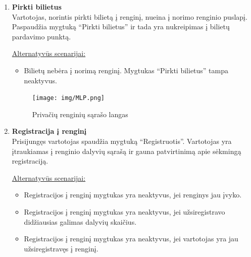 \documentclass{VUMIFPSkursinis}
\begin{document}
\begin{enumerate} [label = \textbf{U\arabic*.}]
				\underline{Alternatyvūs scenarijai:}
				\begin{itemize}
						\item Vartotojui įvedus neteisingą prisijungimo informaciją ar neužpildžius, kurio nors prisijungimo laukelio, sistema paprašo dar kartą įvesti duomenis.
				\end{itemize}

				\begin{figure}[H]
					\centering
					\texttt{[image: img/MLP.png]}
					\caption{Renginio organizatoriaus informacijos patikrinimo langas}
					\label{fig:patikrinti-renginio-organizatoriaus-informacija}
				\end{figure}
			
			\item \textbf{Pirkti bilietus} \\
				Vartotojas, norintis pirkti bilietą į renginį, nueina į norimo renginio puslapį. Paspaudžia mygtuką “Pirkti bilietus” ir tada yra nukreipimas į bilietų pardavimo punktą.
				
				\underline{Alternatyvūs scenarijai:}
				\begin{itemize}
				\item Bilietų nebėra į norimą renginį. Mygtukas “Pirkti bilietus” tampa neaktyvus.
				\end{itemize}
			
				\begin{figure}[H]
					\centering
					\texttt{[image: img/MLP.png]}
					\caption{Privačių renginių sąrašo langas}
					\label{fig:matyti-privacius-renginius}
				\end{figure}
				
			\item \textbf{Registracija į renginį} \\
					Prisijungęs vartotojas spaudžia mygtuką “Registruotis”. Vartotojas yra įtraukiamas į renginio dalyvių sąrašą ir gauna patvirtinimą apie sėkmingą registraciją.
					
				\underline{Alternatyvūs scenarijai:}
				\begin{itemize}
						\item Registracijos į renginį mygtukas yra neaktyvus, jei renginys jau įvyko.
						\item Registracijos į renginį mygtukas yra neaktyvus, jei užsiregistravo didžiausias galimas dalyvių skaičius.
						\item Registracijos į renginį mygtukas yra neaktyvus, jei vartotojas yra jau užsiregistravęs į renginį.
				\end{itemize}


\end{enumerate}
\end{document}
